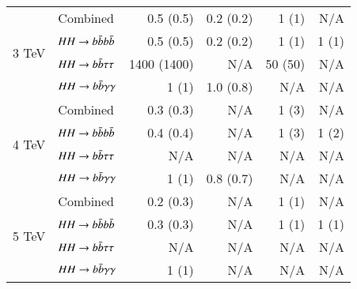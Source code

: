\begin{table}[htbp]
\begin{tabular}{ll|rr|rr}
        \midrule                                                       
        \multirow{4}{*}{3 TeV}      & Combined          & 0.5 (0.5)                        & 0.2 (0.2)                       & 1 (1)                           & N/A            \\
                                    & $HH\rightarrow b\bar{b}b\bar{b}$         & 0.5 (0.5)                        & 0.2 (0.2)                       & 1 (1)                           & 1 (1)          \\
                                    & $HH\rightarrow b\bar{b}\tau\tau$         & 1400 (1400)                      & N/A                             & 50 (50)                         & N/A            \\
                                    & $HH\rightarrow b\bar{b}\gamma\gamma$         & 1 (1)                            & 1.0 (0.8)                       &  N/A                            & N/A            \\
        \midrule                                                       
        \multirow{4}{*}{4 TeV}      & Combined          & 0.3 (0.3)                        & N/A                             & 1 (3)                           & N/A            \\
                                    & $HH\rightarrow b\bar{b}b\bar{b}$         & 0.4 (0.4)                        & N/A                             & 1 (3)                           & 1 (2)          \\
                                    & $HH\rightarrow b\bar{b}\tau\tau$         & N/A                              & N/A                             & N/A                             & N/A            \\
                                    & $HH\rightarrow b\bar{b}\gamma\gamma$         & 1 (1)                            & 0.8 (0.7)                       & N/A                             & N/A            \\
        \midrule                                                       
        \multirow{4}{*}{5 TeV}      & Combined          & 0.2 (0.3)                        & N/A                             & 1 (1)                           & N/A            \\
                                    & $HH\rightarrow b\bar{b}b\bar{b}$         & 0.3 (0.3)                        & N/A                             & 1 (1)                           & 1 (1)          \\
                                    & $HH\rightarrow b\bar{b}\tau\tau$         & N/A                              & N/A                             & N/A                             & N/A            \\
                                    & $HH\rightarrow b\bar{b}\gamma\gamma$         & 1 (1)                            & N/A                             & N/A                             & N/A            \\
        \bottomrule
    \end{tabular}
    \label{tab:grav_cms}
\end{table}
